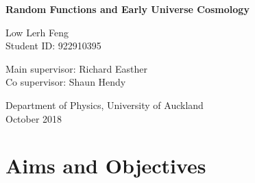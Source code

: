 \documentclass[12pt]{article}
\begin{document}
\begin{titlepage}
    \begin{center}
	\vspace*{1cm}
 
	\Huge
	\textbf{Random Functions and Early Universe Cosmology}
 
	\vspace{0.5cm}
	\Large
 
	\vspace{1.5cm}
 
	Low Lerh Feng \\
	Student ID: 922910395
 
	\vfill
 
	Main supervisor: Richard Easther\\
	Co supervisor: Shaun Hendy
 
	\vspace{0.8cm}
 	Department of Physics, University of Auckland\\
	October 2018
    \end{center}
\end{titlepage}

\section{Aims and Objectives}
\end{document}
